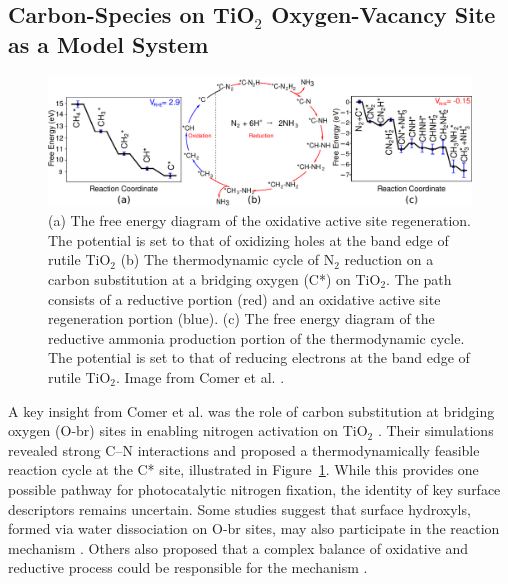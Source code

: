 \subsection{Carbon-Species on TiO$_2$ Oxygen-Vacancy Site as a Model System}

\begin{figure}[h]
\centering
\includegraphics[width=\textwidth]{figures/proposal_figures/N2_redox_cycle_r3.pdf}
\caption{(a) The free energy diagram of the oxidative active site regeneration. The potential is set to that of oxidizing holes at the band edge of rutile TiO$_2$ (b) The thermodynamic cycle of N$_2$ reduction on a carbon substitution at a bridging oxygen (C*) on TiO$_2$. The path consists of a reductive portion (red) and an oxidative active site regeneration portion (blue).  (c) The free energy diagram of the reductive ammonia production portion of the thermodynamic cycle. The potential is set to that of reducing electrons at the band edge of rutile TiO$_2$. Image from Comer et al. \cite{comer2018role}.}
\label{fig:reduct_path}
\end{figure}





A key insight from Comer et al. was the role of carbon substitution at bridging oxygen (O-br) sites in enabling nitrogen activation on TiO$_2$ \cite{comer2018role}. Their simulations revealed strong C–N interactions and proposed a thermodynamically feasible reaction cycle at the C* site, illustrated in Figure~\ref{fig:reduct_path}. While this provides one possible pathway for photocatalytic nitrogen fixation, the identity of key surface descriptors remains uncertain. Some studies suggest that surface hydroxyls, formed via water dissociation on O-br sites, may also participate in the reaction mechanism \cite{Schaub_2001, Henderson1996, Krischok_2001, Ketteler_2007, Xie_2019}. Others also proposed that a complex balance of oxidative and reductive process could be responsible for the mechanism \cite{Comer_sustainable}.

